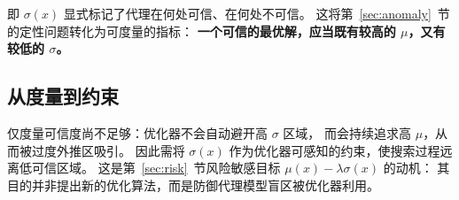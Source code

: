 即 $\sigma(x)$ 显式标记了代理在何处可信、在何处不可信。
这将第~\ref{sec:anomaly}~节的定性问题转化为可度量的指标：
\textbf{一个可信的最优解，应当既有较高的 $\mu$，又有较低的 $\sigma$。}

\subsection{从度量到约束}

仅度量可信度尚不足够：优化器不会自动避开高 $\sigma$ 区域，
而会持续追求高 $\mu$，从而被过度外推区吸引。
因此需将 $\sigma(x)$ 作为优化器可感知的约束，使搜索过程远离低可信区域。
这是第~\ref{sec:risk}~节风险敏感目标 $\mu(x)-\lambda\sigma(x)$ 的动机：
其目的并非提出新的优化算法，而是防御代理模型盲区被优化器利用。

